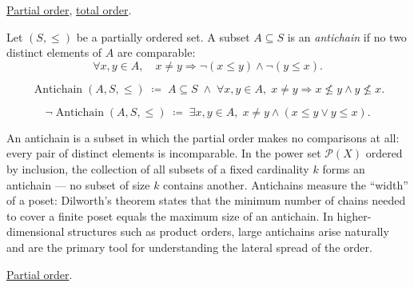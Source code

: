 \begin{remark*}[Dependencies]
\hyperref[def:lattice-order-partial-order]{Partial order},
\hyperref[def:lattice-order-total-order]{total order}.
\end{remark*}


\begin{tcolorbox}[colback=defbox, colframe=defborder, arc=2pt,
  left=6pt, right=6pt, top=4pt, bottom=4pt,
  title={\small\textbf{Definition (Antichain)}},
  fonttitle=\small\bfseries]
\begin{definition}[Antichain]
\label{def:antichain}
Let $(S, \leq)$ be a partially ordered set.  A subset $A \subseteq S$ is
an \emph{antichain} if no two distinct elements of $A$ are comparable:
\[
\forall x, y \in A, \quad x \neq y \Longrightarrow \neg(x \leq y) \land \neg(y \leq x).
\]
\end{definition}
\end{tcolorbox}

\begin{remark*}
\[
\operatorname{Antichain}(A, S, \leq)
\;\coloneqq\;
A \subseteq S
\;\land\;
\forall x, y \in A,\; x \neq y \Rightarrow x \not\leq y \land y \not\leq x.
\]
\end{remark*}

\begin{remark*}
\[
\neg\operatorname{Antichain}(A, S, \leq)
\;\coloneqq\;
\exists x, y \in A,\; x \neq y \land (x \leq y \lor y \leq x).
\]
\end{remark*}

\begin{remark*}[Interpretation]
An antichain is a subset in which the partial order makes no comparisons at
all: every pair of distinct elements is incomparable.  In the power set
$\mathcal{P}(X)$ ordered by inclusion, the collection of all subsets of
a fixed cardinality $k$ forms an antichain — no subset of size $k$ contains
another.  Antichains measure the ``width'' of a poset: Dilworth's theorem
states that the minimum number of chains needed to cover a finite poset
equals the maximum size of an antichain.  In higher-dimensional structures
such as product orders, large antichains arise naturally and are the primary
tool for understanding the lateral spread of the order.
\end{remark*}

\begin{remark*}[Dependencies]
\hyperref[def:lattice-order-partial-order]{Partial order}.
\end{remark*}
